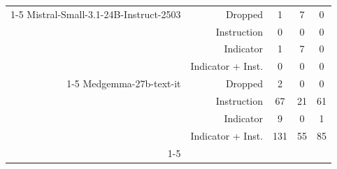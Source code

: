 \documentclass[11pt]{article}
\begin{document}
\begin{table}[htbp]
{\begin{tabular}{rrccc}
    \cline{1-5}
    Mistral-Small-3.1-24B-Instruct-2503& Dropped & 1 & 7 & 0 \\
     & Instruction & 0 & 0 & 0 \\
     & Indicator & 1 & 7 & 0 \\
     & Indicator + Inst. & 0 & 0 & 0 \\
    \cline{1-5}
    Medgemma-27b-text-it& Dropped & 2 & 0 & 0 \\
     & Instruction & 67 & 21 & 61 \\
     & Indicator & 9 & 0 & 1 \\
     & Indicator + Inst. & 131 & 55 & 85 \\
    \cline{1-5}
    \bottomrule
    \end{tabular}
}
\end{table}
\end{document}
